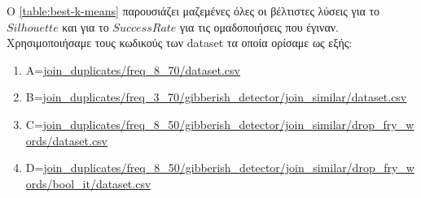 Ο \hyperref[table:best-k-means]{\tablename{} \ref{table:best-k-means}}
παρουσιάζει μαζεμένες όλες οι βέλτιστες λύσεις για το $Silhouette$ και για το $Success Rate$ για τις ομαδοποιήσεις που έγιναν.
Χρησιμοποιήσαμε τους κωδικούς των dataset τα οποία ορίσαμε ως εξής:
\begin{enumerate}
    \item A=\url{join_duplicates/freq_8_70/dataset.csv}
    \item B=\url{join_duplicates/freq_3_70/gibberish_detector/join_similar/dataset.csv}
    \item C=\url{join_duplicates/freq_8_50/gibberish_detector/join_similar/drop_fry_words/dataset.csv}
    \item D=\url{join_duplicates/freq_8_50/gibberish_detector/join_similar/drop_fry_words/bool_it/dataset.csv}
\end{enumerate}
\FloatBarrier
